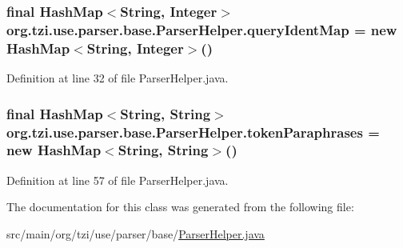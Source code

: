 \hypertarget{classorg_1_1tzi_1_1use_1_1parser_1_1base_1_1_parser_helper_a4c76a429f63273d979eae9c33c43ecb4}{
\subsubsection[{query\-Ident\-Map}]{\setlength{\rightskip}{0pt plus 5cm}final Hash\-Map$<$String, Integer$>$ org.\-tzi.\-use.\-parser.\-base.\-Parser\-Helper.\-query\-Ident\-Map = new Hash\-Map$<$String, Integer$>$()\hspace{0.3cm}{\ttfamily [static]}}}\label{classorg_1_1tzi_1_1use_1_1parser_1_1base_1_1_parser_helper_a4c76a429f63273d979eae9c33c43ecb4}


Definition at line 32 of file Parser\-Helper.\-java.

\hypertarget{classorg_1_1tzi_1_1use_1_1parser_1_1base_1_1_parser_helper_a96977066b217274e493f569236081f42}{
\subsubsection[{token\-Paraphrases}]{\setlength{\rightskip}{0pt plus 5cm}final Hash\-Map$<$String, String$>$ org.\-tzi.\-use.\-parser.\-base.\-Parser\-Helper.\-token\-Paraphrases = new Hash\-Map$<$String, String$>$()\hspace{0.3cm}{\ttfamily [static]}}}\label{classorg_1_1tzi_1_1use_1_1parser_1_1base_1_1_parser_helper_a96977066b217274e493f569236081f42}


Definition at line 57 of file Parser\-Helper.\-java.



The documentation for this class was generated from the following file\-:\begin{DoxyCompactItemize}
\item 
src/main/org/tzi/use/parser/base/\hyperlink{_parser_helper_8java}{Parser\-Helper.\-java}\end{DoxyCompactItemize}
